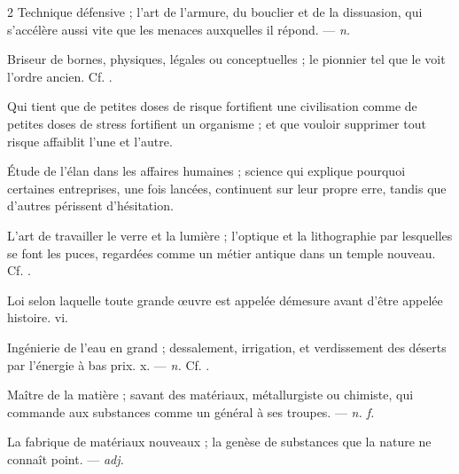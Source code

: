 \begin{multicols}{2}
 Technique défensive ; l'art de l'armure, du bouclier et de la dissuasion, qui s'accélère aussi vite que les menaces auxquelles il répond. —  \textit{n.}

 Briseur de bornes, physiques, légales ou conceptuelles ; le pionnier tel que le voit l'ordre ancien. Cf. .

 Qui tient que de petites doses de risque fortifient une civilisation comme de petites doses de stress fortifient un organisme ; et que vouloir supprimer tout risque affaiblit l'une et l'autre.

 Étude de l'élan dans les affaires humaines ; science qui explique pourquoi certaines entreprises, une fois lancées, continuent sur leur propre erre, tandis que d'autres périssent d'hésitation.

 L'art de travailler le verre et la lumière ; l'optique et la lithographie par lesquelles se font les puces, regardées comme un métier antique dans un temple nouveau. Cf. .

 Loi selon laquelle toute grande œuvre est appelée démesure avant d'être appelée histoire.   vi.

 Ingénierie de l'eau en grand ; dessalement, irrigation, et verdissement des déserts par l'énergie à bas prix.   x. —  \textit{n.} Cf. .

 Maître de la matière ; savant des matériaux, métallurgiste ou chimiste, qui commande aux substances comme un général à ses troupes. —  \textit{n. f.}

 La fabrique de matériaux nouveaux ; la genèse de substances que la nature ne connaît point. —  \textit{adj.}


\end{multicols}
